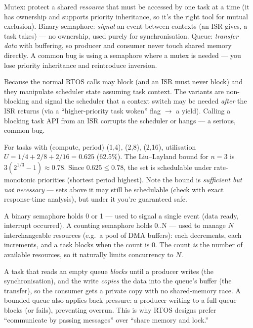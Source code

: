 Mutex: protect a shared \emph{resource} that must be accessed by one task at a
time (it has ownership and supports priority inheritance, so it's the right
tool for mutual exclusion). Binary semaphore: \emph{signal} an event between
contexts (an ISR gives, a task takes) --- no ownership, used purely for
synchronisation. Queue: \emph{transfer data} with buffering, so producer and
consumer never touch shared memory directly. A common bug is using a semaphore
where a mutex is needed --- you lose priority inheritance and reintroduce
inversion.

Because the normal RTOS calls may block (and an ISR must never block) and they
manipulate scheduler state assuming task context. The 
variants are non-blocking and signal the scheduler that a context switch may be
needed \emph{after} the ISR returns (via a ``higher-priority task woken'' flag
$\rightarrow$ a yield). Calling a blocking task API from an ISR corrupts the
scheduler or hangs --- a serious, common bug.

For tasks with (compute, period) (1,4), (2,8), (2,16), utilisation
$U = 1/4 + 2/8 + 2/16 = 0.625$ (62.5\%). The Liu--Layland bound for $n=3$ is
$3(2^{1/3}-1) \approx 0.78$. Since $0.625 \le 0.78$, the set is schedulable
under rate-monotonic priorities (shortest period highest). Note the bound is
\emph{sufficient but not necessary} --- sets above it may still be schedulable
(check with exact response-time analysis), but under it you're guaranteed safe.

A binary semaphore holds 0 or 1 --- used to signal a single event (data ready,
interrupt occurred). A counting semaphore holds 0..N --- used to manage $N$
interchangeable resources (e.g.\ a pool of DMA buffers): each 
decrements, each  increments, and a task blocks when the count is 0.
The count \emph{is} the number of available resources, so it naturally limits
concurrency to $N$.

A task that reads an empty queue \emph{blocks} until a producer writes (the
synchronisation), and the write \emph{copies} the data into the queue's buffer
(the transfer), so the consumer gets a private copy with no shared-memory race.
A bounded queue also applies back-pressure: a producer writing to a full queue
blocks (or fails), preventing overrun. This is why RTOS designs prefer
``communicate by passing messages'' over ``share memory and lock.''

